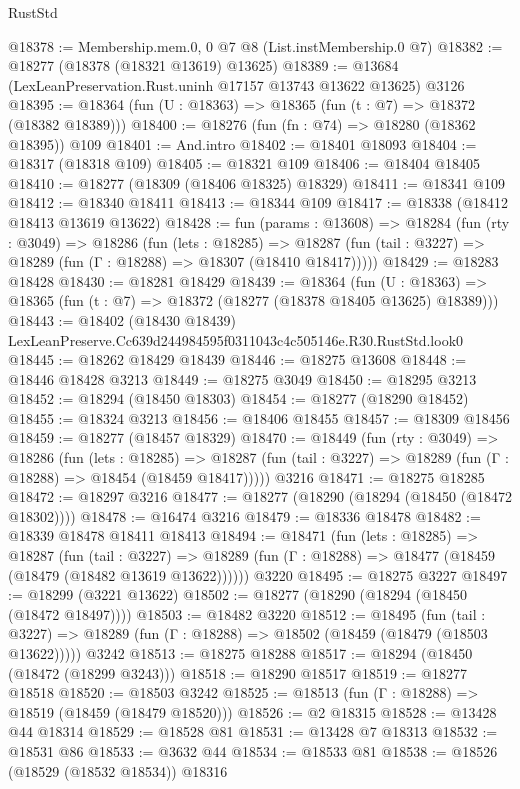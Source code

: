 \begin{lexlean}{RustStd}
\begin{coremodule}
@18378 := Membership.mem.{0, 0} @7 @8 (List.instMembership.{0} @7)
@18382 := @18277 (@18378 (@18321 @13619) @13625)
@18389 := @13684 (LexLeanPreservation.Rust.uninh @17157 @13743 @13622 @13625) @3126
@18395 := @18364 (fun (U : @18363) => @18365 (fun (t : @7) => @18372 (@18382 @18389)))
@18400 := @18276 (fun (fn : @74) => @18280 (@18362 @18395)) @109
@18401 := And.intro
@18402 := @18401 @18093
@18404 := @18317 (@18318 @109)
@18405 := @18321 @109
@18406 := @18404 @18405
@18410 := @18277 (@18309 (@18406 @18325) @18329)
@18411 := @18341 @109
@18412 := @18340 @18411
@18413 := @18344 @109
@18417 := @18338 (@18412 @18413 @13619 @13622)
@18428 := fun (params : @13608) =>
  @18284
    (fun (rty : @3049) =>
    @18286
      (fun (lets : @18285) =>
      @18287 (fun (tail : @3227) => @18289 (fun (Γ : @18288) => @18307 (@18410 @18417)))))
@18429 := @18283 @18428
@18430 := @18281 @18429
@18439 := @18364
    (fun (U : @18363) => @18365 (fun (t : @7) => @18372 (@18277 (@18378 @18405 @13625) @18389)))
@18443 := @18402 (@18430 @18439) LexLeanPreserve.Cc639d244984595f0311043c4c505146e.R30.RustStd.look0
@18445 := @18262 @18429 @18439
@18446 := @18275 @13608
@18448 := @18446 @18428 @3213
@18449 := @18275 @3049
@18450 := @18295 @3213
@18452 := @18294 (@18450 @18303)
@18454 := @18277 (@18290 @18452)
@18455 := @18324 @3213
@18456 := @18406 @18455
@18457 := @18309 @18456
@18459 := @18277 (@18457 @18329)
@18470 := @18449
    (fun (rty : @3049) =>
    @18286
      (fun (lets : @18285) =>
      @18287 (fun (tail : @3227) => @18289 (fun (Γ : @18288) => @18454 (@18459 @18417)))))
    @3216
@18471 := @18275 @18285
@18472 := @18297 @3216
@18477 := @18277 (@18290 (@18294 (@18450 (@18472 @18302))))
@18478 := @16474 @3216
@18479 := @18336 @18478
@18482 := @18339 @18478 @18411 @18413
@18494 := @18471
    (fun (lets : @18285) =>
    @18287
      (fun (tail : @3227) =>
      @18289 (fun (Γ : @18288) => @18477 (@18459 (@18479 (@18482 @13619 @13622))))))
    @3220
@18495 := @18275 @3227
@18497 := @18299 (@3221 @13622)
@18502 := @18277 (@18290 (@18294 (@18450 (@18472 @18497))))
@18503 := @18482 @3220
@18512 := @18495
    (fun (tail : @3227) => @18289 (fun (Γ : @18288) => @18502 (@18459 (@18479 (@18503 @13622)))))
    @3242
@18513 := @18275 @18288
@18517 := @18294 (@18450 (@18472 (@18299 @3243)))
@18518 := @18290 @18517
@18519 := @18277 @18518
@18520 := @18503 @3242
@18525 := @18513 (fun (Γ : @18288) => @18519 (@18459 (@18479 @18520)))
@18526 := @2 @18315
@18528 := @13428 @44 @18314
@18529 := @18528 @81
@18531 := @13428 @7 @18313
@18532 := @18531 @86
@18533 := @3632 @44
@18534 := @18533 @81
@18538 := @18526 (@18529 (@18532 @18534)) @18316

\end{coremodule}
\end{lexlean}
